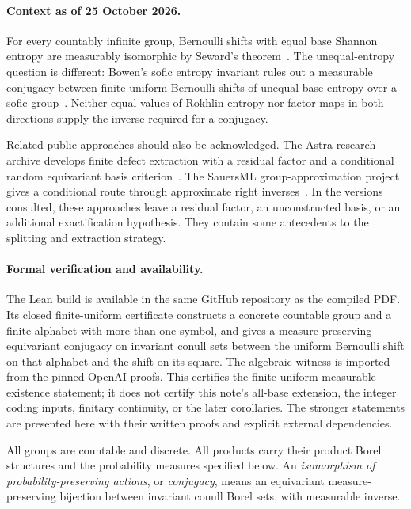 \documentclass[11pt,a4paper]{article}
\numberwithin{equation}{section}
\begin{document}
\paragraph{Context as of 25 October 2026.}
For every countably infinite group, Bernoulli shifts with equal base
Shannon entropy are measurably isomorphic by Seward's theorem~\cite{Seward}.
The unequal-entropy question is different: Bowen's sofic entropy invariant
rules out a measurable conjugacy between finite-uniform Bernoulli shifts
of unequal base entropy over a sofic group~\cite{BowenSofic}.
Neither equal values of Rokhlin entropy nor factor maps in both directions
supply the inverse required for a conjugacy.

Related public approaches should also be acknowledged. The Astra research
archive develops finite defect extraction with a residual factor and a
conditional random equivariant basis criterion~\cite{Astra}. The
SauersML group-approximation project gives a conditional route through
approximate right inverses~\cite{Sauers}. In the versions consulted,
these approaches leave a residual factor, an unconstructed basis, or an
additional exactification hypothesis. They contain some antecedents to the
splitting and extraction strategy.

\paragraph{Formal verification and availability.}
The Lean build is available in the same GitHub repository as the compiled
PDF. Its closed finite-uniform certificate constructs a concrete countable
group and a finite alphabet with more than one symbol, and gives a
measure-preserving equivariant conjugacy on invariant conull sets between
the uniform Bernoulli shift on that alphabet and the shift on its square.
The algebraic witness is imported from the pinned OpenAI proofs. This
certifies the finite-uniform measurable existence statement; it does not
certify this note's all-base extension, the integer coding inputs,
finitary continuity, or the later corollaries. The stronger statements
are presented here with their written proofs and explicit external
dependencies.

All groups are countable and discrete. All products carry their product
Borel structures and the probability measures specified below. An
\emph{isomorphism of probability-preserving actions}, or \emph{conjugacy},
means an equivariant measure-preserving bijection between invariant conull
Borel sets, with measurable inverse.
\end{document}
